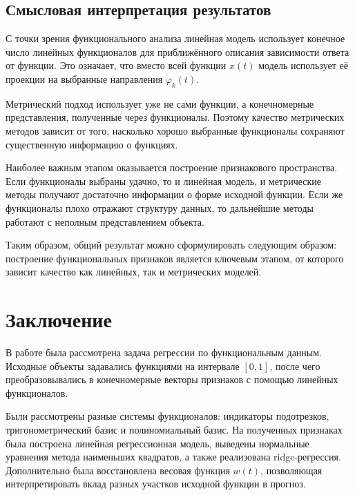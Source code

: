 \documentclass[14pt,a4paper]{extarticle}
\begin{document}
\subsection{Смысловая интерпретация результатов}

С точки зрения функционального анализа линейная модель использует конечное число линейных функционалов для приближённого описания зависимости ответа от функции. Это означает, что вместо всей функции \(x(t)\) модель использует её проекции на выбранные направления \(\varphi_k(t)\).

Метрический подход использует уже не сами функции, а конечномерные представления, полученные через функционалы. Поэтому качество метрических методов зависит от того, насколько хорошо выбранные функционалы сохраняют существенную информацию о функциях.

Наиболее важным этапом оказывается построение признакового пространства. Если функционалы выбраны удачно, то и линейная модель, и метрические методы получают достаточно информации о форме исходной функции. Если же функционалы плохо отражают структуру данных, то дальнейшие методы работают с неполным представлением объекта.

Таким образом, общий результат можно сформулировать следующим образом: построение функциональных признаков является ключевым этапом, от которого зависит качество как линейных, так и метрических моделей.


\section*{Заключение}

В работе была рассмотрена задача регрессии по функциональным данным. Исходные объекты задавались функциями на интервале \([0,1]\), после чего преобразовывались в конечномерные векторы признаков с помощью линейных функционалов.

Были рассмотрены разные системы функционалов: индикаторы подотрезков, тригонометрический базис и полиномиальный базис. На полученных признаках была построена линейная регрессионная модель, выведены нормальные уравнения метода наименьших квадратов, а также реализована ridge-регрессия. Дополнительно была восстановлена весовая функция \(w(t)\), позволяющая интерпретировать вклад разных участков исходной функции в прогноз.
\end{document}
